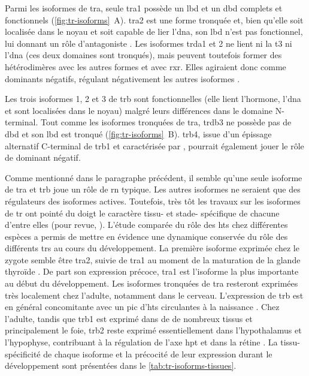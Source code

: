 \documentclass[../main.tex]{subfiles}
\begin{document}
Parmi les isoformes de \gls{tra}, seule \gls{tra}1 possède un \gls{lbd} et un \gls{dbd} complets et fonctionnels (\autoref{fig:tr-isoforms}~A).
\gls{tra}2 est une forme tronquée et, bien qu'elle soit localisée dans le noyau et soit capable de lier l'\gls{dna}, son \gls{lbd} n'est pas fonctionnel, lui donnant un rôle d'antagoniste \citep{Chassande1997}.
Les isoformes \gls{trda}1 et 2 ne lient ni la \gls{t3} ni l'\gls{dna} (ces deux domaines sont tronqués), mais peuvent toutefois former des hétérodimères avec les autres formes et avec \gls{rxr}.
Elles agiraient donc comme dominants négatifs, régulant négativement les autres isoformes \citep{Plateroti2001}.



Les trois isoformes 1, 2 et 3 de \gls{trb} sont fonctionnelles (elle lient l'hormone, l'\gls{dna} et sont localisées dans le noyau) malgré leurs différences dans le domaine N-terminal.
Tout comme les isoformes tronquées de \gls{tra}, \gls{trdb}3 ne possède pas de \gls{dbd} et son \gls{lbd} est tronqué (\autoref{fig:tr-isoforms}~B).
\gls{trb}4, issue d'un épissage alternatif C-terminal de \gls{trb}1 et caractérisée par \citet{Tagami2010}, pourrait également jouer le rôle de dominant négatif.

Comme mentionné dans le paragraphe précédent, il semble qu'une seule isoforme de \gls{tra} et \gls{trb} joue un rôle de \gls{rn} typique.
Les autres isoformes ne seraient que des régulateurs des isoformes actives.
Toutefois, très tôt les travaux sur les isoformes de \gls{tr} ont pointé du doigt le caractère tissu- et stade- spécifique de chacune d'entre elles (pour revue, \citealp{Flamant2003,Cheng2010}).
L'étude comparée du rôle des \glspl{ht} chez différentes espèces a permis de mettre en évidence une dynamique conservée du rôle des différents \glspl{tr} au cours du développement.
La première isoforme exprimée chez le zygote semble être \gls{tra}2, suivie de \gls{tra}1 au moment de la maturation de la glande thyroïde \citep{Strait1991}.
De part son expression précoce, \gls{tra}1 est l'isoforme la plus importante au début du développement.
Les isoformes tronquées de \gls{tra} resteront exprimées très localement chez l'adulte, notamment dans le cerveau.
L'expression de \gls{trb} est en général concomitante avec un pic d'\glspl{ht} circulantes à la naissance \citep{Keijzer2007}.
Chez l'adulte, tandis que \gls{trb}1 est exprimé dans de de nombreux tissus et principalement le foie, \gls{trb}2 reste exprimé essentiellement dans l'hypothalamus et l'hypophyse, contribuant à la régulation de l'axe \gls{hpt} \citep{Schwartz1994} et dans la rétine \citep{Abel1999,}.
La tissu-spécificité de chaque isoforme et la précocité de leur expression durant le développement sont présentées dans le \autoref{tab:tr-isoforms-tissues}.
\end{document}

